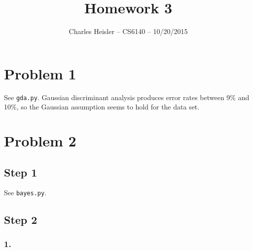 \documentclass[12pt]{article}
\title{Homework 3}
\author{Charles Heisler -- CS6140 -- 10/20/2015}
\date{}
\begin{document}
\maketitle

\section*{Problem 1}
See \texttt{gda.py}. Gaussian discriminant analysis produces error rates between 9\% and 10\%, so the Gaussian assumption seems to hold for the data set.

\section*{Problem 2}
	\subsection*{Step 1}
	See \texttt{bayes.py}.
	
	\subsection*{Step 2}
		\subsubsection*{1.}
		\renewcommand{\arraystretch}{2.5}
		
\end{document}
